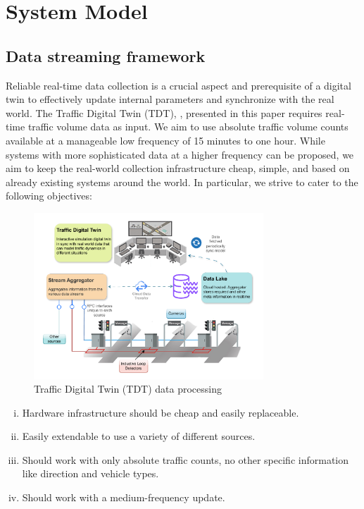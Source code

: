 \section{System Model}\label{sec:system-model}
\subsection{\textbf{Data streaming framework}}

Reliable real-time data collection is a crucial aspect and prerequisite of a digital twin to effectively update internal parameters and synchronize with the real world. The Traffic Digital Twin (TDT), \name, presented in this paper requires real-time traffic volume data as input. We aim to use absolute traffic volume counts available at a manageable low frequency of 15 minutes to one hour. While systems with more sophisticated data at a higher frequency can be proposed, we aim to keep the real-world collection infrastructure cheap, simple, and based on already existing systems around the world. In particular, we strive to cater to the following objectives:

\begin{figure}[t]
  \centering
  \includegraphics[width=0.77\textwidth]{framework.pdf} %
  \caption{Traffic Digital Twin (TDT) data processing}
  \label{fig:framework}
\end{figure}

\begin{enumerate}[(i)]
    \item Hardware infrastructure should be cheap and easily replaceable.
    \item Easily extendable to use a variety of different sources.
    \item Should work with only absolute traffic counts, no other specific information like direction and vehicle types.
    \item Should work with a medium-frequency update.
\end{enumerate}

